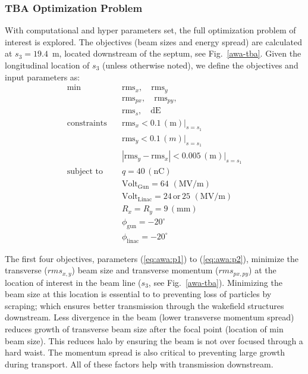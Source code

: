 \subsubsection{TBA Optimization Problem}
With computational and hyper parameters set, 
the full optimization problem of interest is explored.
The objectives (beam sizes and energy spread) are calculated at 
$s_3=19.4$~m, located downstream of the septum, see Fig.~\ref{awa-tba}. 
Given the longitudinal location of $s_3$ (unless otherwise noted), 
we define the objectives and input parameters as:
\begin{align}
\text{min}  \quad & \text{rms}_{x}, \quad \text{rms}_{y} \label{eq:awa:p1}\\
& \text{rms}_{px}, \quad \text{rms}_{py}, \label{eq:awa:p2}\\
& \text{rms}_{s}, \quad \text{dE} \label{eq:awa:p4} \\
\text{constraints} \quad & \text{rms}_x < 0.1 \, (\text{m}) |_{s=s_1}\label{eq:awa:c1}\\
\quad & \text{rms}_y < 0.1\, (m) |_{s=s_1}\, \label{eq:awa:c2}\\
\quad & |\text{rms}_y - \text{rms}_x | < 0.005 \, (\text{m}) |_{s=s_1}\label{eq:awa:c3}\\
\text{subject to} \quad & q = 40 \, (\text{nC}) \label{eq:awa:firstconstr}\\
\quad & \text{Volt}_{\text{Gun}} = 64 \, \, (\text{MV/m}) \label{eq:awa:lastconstr}\\
\quad & \text{Volt}_{\text{Linac}} = 24 \, \text{or} \, 25\,\, (\text{MV/m}) \\
\quad & R_x = R_y = 9 \, (\text{mm}) \label{eq:awa:firstdvar}\\
\quad & \phi_{\text{gun}} =-20^\circ \label{eq:awa:gphidvar}\\
\quad & \phi_{\text{linac}} =-20^\circ \label{eq:awa:lastdvar}
\end{align}



The first four objectives, parameters (\ref{eq:awa:p1}) to (\ref{eq:awa:p2}),
minimize the transverse ($rms_{x,y}$) beam size and transverse momentum ($rms_{px,py}$)
at the location of interest in the beam line ($s_3$, see Fig.~\ref{awa-tba}). 
Minimizing the beam size at this location is essential to 
to preventing loss of particles by scraping; 
which ensures better transmission through the wakefield structures downstream. 
Less divergence in the beam (lower transverse momentum spread) 
reduces growth of transverse beam size after the focal point (location of min beam size).
This reduces halo by ensuring the beam is not over focused through a hard waist.
The momentum spread is also critical to preventing large growth during transport. 
All of these factors help with transmission downstream. 

